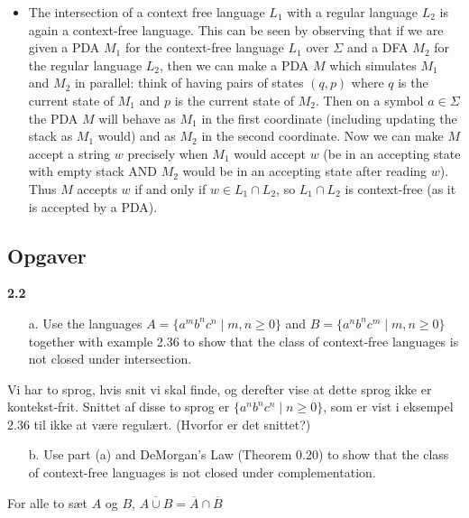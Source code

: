 \begin{itemize}
  \item The intersection of a context free language $L_{1}$ with a regular language $L_{2}$ is again a context-free language. This can be seen by observing that if we are given a PDA $M_{1}$ for the context-free language $L_{1}$ over $\Sigma$ and a DFA $M_{2}$ for the regular language $L_{2}$, then we can make a PDA $M$ which simulates $M_{1}$ and $M_{2}$ in parallel: think of having pairs of states $(q,p)$ where $q$ is the current state of $M_{1}$ and $p$ is the current state of $M_{2}$. Then on a symbol $a \in \Sigma$ the PDA $M$ will behave as $M_{1}$ in the first coordinate (including updating the stack as $M_{1}$ would) and as $M_2$ in the second coordinate. Now we can make $M$ accept a string $w$ precisely when $M_{1}$ would accept $w$ (be in an accepting state with empty stack AND $M_{2}$ would be in an accepting state after reading $w$). Thus $M$ accepts $w$ if and only if $w \in L_{1} \cap L_{2}$, so $L_{1} \cap L_{2}$ is context-free (as it is accepted by a PDA).

\end{itemize}


\subsection{Opgaver}%
\label{subsec:2exercises}

\noindent
{\Large \textbf{2.2}}\\
\noindent
\begin{enumerate}
  \item[a.] Use the languages $A = \{a^{m}b^{n}c^{n} \; | \; m,n \ge 0\}$ and $B = \{a^{n}b^{n}c^{m} \; | \; m,n \ge 0\}$ together with example 2.36 to show that the class of context-free languages is not closed under intersection.
\end{enumerate}

Vi har to sprog, hvis snit vi skal finde, og derefter vise at dette sprog ikke er kontekst-frit. Snittet af disse to sprog er $\{a^{n}b^{n}c^{n}\; | \; n \ge 0\}$, som er vist i eksempel 2.36 til ikke at være regulært. (Hvorfor er det snittet?)

\begin{enumerate}
  \item[b.] Use part (a) and DeMorgan's Law (Theorem 0.20) to show that the class of context-free languages is not closed under complementation.
\end{enumerate}

\begin{theorem}
For alle to sæt $A$ og $B$, $\overline{A \cup B} = \overline{A} \cap \overline{B}$
\end{theorem}

